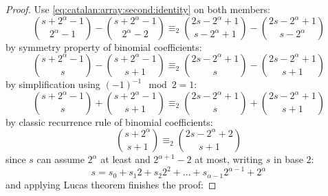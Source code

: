 \begin{proof}
    Use \autoref{eq:catalan:array:second:identity} on both members:
    \begin{displaymath}
        {{s+2^{\alpha}-1}\choose{2^{\alpha}-1}}- {{s+2^{\alpha}-1}\choose{2^{\alpha}-2}} \equiv_{2}
        {{2s-2^{\alpha}+1}\choose{s-2^{\alpha}+1}}- {{2s-2^{\alpha}+1}\choose{s-2^{\alpha}}}
    \end{displaymath}
    by symmetry property of binomial coefficients:
    \begin{displaymath}
        {{s+2^{\alpha}-1}\choose{s}}- {{s+2^{\alpha}-1}\choose{s+1}} \equiv_{2}
        {{2s-2^{\alpha}+1}\choose{s}}- {{2s-2^{\alpha}+1}\choose{s+1}}
    \end{displaymath}
    by simplification using $(-1)^{-1}\mod 2=1$: 
    \begin{displaymath}
        {{s+2^{\alpha}-1}\choose{s}}+ {{s+2^{\alpha}-1}\choose{s+1}} \equiv_{2}
        {{2s-2^{\alpha}+1}\choose{s}}+ {{2s-2^{\alpha}+1}\choose{s+1}}
    \end{displaymath}
    by classic recurrence rule of binomial coefficients:
    \begin{displaymath}
        {{s+2^{\alpha}}\choose{s+1}} \equiv_{2} {{2s-2^{\alpha}+2}\choose{s+1}}
    \end{displaymath}
    since $s$ can assume $2^{\alpha}$ at least and $2^{\alpha+1}-2$ at most, 
    writing $s$   in base $2$:
    \begin{displaymath}
        s=s_{0} + s_{1}2 + s_{2}2^{2}+\ldots+s_{\alpha-1}2^{\alpha-1}+2^{\alpha}
    \end{displaymath}
    and applying Lucas theorem finishes the proof:


\end{proof}
